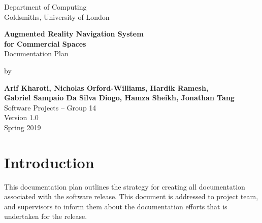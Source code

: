 \documentclass[12pt]{article}
\begin{document}
\begin{titlepage}
    \begin{center}
        \vspace*{1cm}
        Department of Computing\\
        Goldsmiths, University of London\\

        \vspace*{3.25cm}

        \textbf{\LARGE Augmented Reality Navigation System\\}
        \vspace*{0.20cm}           
        \textbf{\LARGE for Commercial Spaces}\\
        \vspace*{0.55cm}           
        {\large Documentation Plan}\\
        \vspace*{0.15cm}           

        \vspace*{2cm}
        by\\
        \vspace*{0.25cm}   

        \textbf{Arif Kharoti, Nicholas Orford-Williams, Hardik Ramesh,\\}
        \textbf{Gabriel Sampaio Da Silva Diogo, Hamza Sheikh, Jonathan Tang\\}
        \vspace*{0.1cm}    
        Software Projects – Group 14\\  

        \vspace{2cm}
        Version 1.0\\
        Spring 2019
        \vfill


        \vspace{1.5cm}

    \end{center}
\end{titlepage}


\section{Introduction}
This documentation plan outlines the strategy for creating all documentation associated with the software release. This document is addressed to project team, and supervisors to inform them about the documentation efforts that is undertaken for the release.
\end{document}
